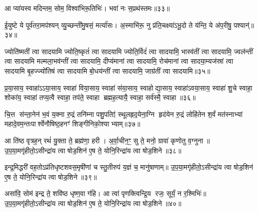{\anuvakamend[{त॒रणि॑र्विश॒तिः॥31॥}]}

आ प्या॑यस्व मदिन्तम॒ सोम॒ विश्वा॑भिरू॒तिभिः॑। भवा॑ नः स॒प्रथ॑स्तमः॥३३॥

{\anuvakamend[{आ प्या॑यस्व॒ नव॑॥32॥}]}

ई॒युष्टे ये पूर्व॑तरा॒मप॑श्यन् व्यु॒च्छन्ती॑मु॒षसं॒ मर्त्या॑सः। अ॒स्माभि॑रू॒ नु प्र॑ति॒चक्ष्या॑ऽभू॒दो ते य॑न्ति॒ ये अ॑प॒रीषु॒ पश्यान्॑॥३४॥

{\anuvakamend[{ई॒युरेका॒न्नविꣳ॑शतिः॥33॥}]}

ज्योति॑ष्मतीं त्वा सादयामि ज्योति॒ष्कृतं॑ त्वा सादयामि ज्योति॒र्विदं॑ त्वा सादयामि॒ भास्व॑तीं त्वा सादयामि॒ ज्वल॑न्तीं त्वा सादयामि मल्मला॒भव॑न्तीं त्वा सादयामि॒ दीप्य॑मानां त्वा सादयामि॒ रोच॑मानां त्वा सादया॒म्यज॑स्रां त्वा सादयामि बृ॒हज्ज्यो॑तिषं त्वा सादयामि बो॒धय॑न्तीं त्वा सादयामि॒ जाग्र॑तीं त्वा सादयामि॥३५॥

{\anuvakamend[{ज्योति॑ष्मती॒ꣳ॒ षट्त्रिꣳ॑शत्॥34॥}]}

प्र॒या॒साय॒ स्वाहा॑ऽऽया॒साय॒ स्वाहा॑ विया॒साय॒ स्वाहा॑ संया॒साय॒ स्वाहोद्या॒साय॒ स्वाहा॑ऽवया॒साय॒ स्वाहा॑ शु॒चे स्वाहा॒ शोका॑य॒ स्वाहा॑ तप्य॒त्वै स्वाहा॒ तप॑ते॒ स्वाहा ब्रह्मह॒त्यायै॒ स्वाहा॒ सर्व॑स्मै॒ स्वाहा॥३६॥

{\anuvakamend[{प्र॒या॒साय॒ चतु॑र्विशतिः॥35॥}]}

चि॒त्त स॑न्ता॒नेन॑ भ॒वं य॒क्ना रु॒द्रं तनि॑म्ना पशु॒पतिꣵ॑ स्थूलहृद॒येना॒ग्नि हृद॑येन रु॒द्रं लोहि॑तेन श॒र्वं मत॑स्नाभ्यां महादे॒वम॒न्तःपार्श्वेनौषिष्ठ॒हनꣳ॑ शिङ्गीनिको॒श्याभ्याम्॥३७॥

{\anuvakamend[{चि॒त्तम॒ष्टाद॑श॥36॥}]}

आ ति॑ष्ठ वृत्रह॒न् रथं॑ यु॒क्ता ते॒ ब्रह्म॑णा॒ हरी। अ॒र्वा॒चीन॒ꣳ॒ सु ते॒ मनो॒ ग्रावा॑ कृणोतु व॒ग्नुना॥ उ॒प॒या॒मगृ॑हीतो॒ऽसीन्द्रा॑य त्वा षोड॒शिन॑ ए॒ष ते॒ योनि॒रिन्द्रा॑य त्वा षोड॒शिने॥३८॥

{\anuvakamend[{आ ति॑ष्ठ॒ षड्विꣳ॑शतिः॥37॥}]}

इन्द्र॒मिद्धरी॑ वह॒तोऽप्र॑तिधृष्टशवस॒मृषी॑णां च स्तु॒तीरुप॑ य॒ज्ञं च॒ मानु॑षाणाम्॥ उ॒प॒या॒मगृ॑हीतो॒ऽसीन्द्रा॑य त्वा षोड॒शिन॑ ए॒ष ते॒ योनि॒रिन्द्रा॑य त्वा षोड॒शिने॥३९॥

{\anuvakamend[{इन्द्र॒मित्त्रयो॑विशतिः॥38॥}]}

असा॑वि॒ सोम॑ इन्द्र ते॒ शवि॑ष्ठ धृष्ण॒वा ग॑हि। आ त्वा॑ पृणक्त्विन्द्रि॒य रजः॒ सूर्यं॒ न र॒श्मिभिः॑॥ उ॒प॒या॒मगृ॑हीतो॒ऽसीन्द्रा॑य त्वा षोड॒शिन॑ ए॒ष ते॒ योनि॒रिन्द्रा॑य त्वा षोड॒शिने॥४०॥

